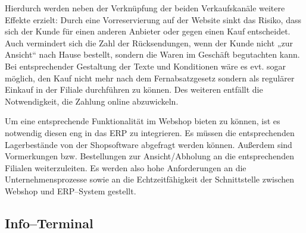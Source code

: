 Hierdurch werden neben der Verknüpfung der beiden Verkaufskanäle weitere Effekte erzielt: Durch eine Vorreservierung auf der Website sinkt das Risiko, dass sich der Kunde für einen anderen Anbieter oder gegen einen Kauf entscheidet. Auch vermindert sich die Zahl der Rücksendungen, wenn der Kunde nicht „zur Ansicht“ nach Hause bestellt, sondern die Waren im Geschäft begutachten kann. Bei entsprechender Gestaltung der Texte und Konditionen wäre es evt. sogar möglich, den Kauf nicht mehr nach dem Fernabsatzgesetz sondern als regulärer Einkauf in der Filiale durchführen zu können. Des weiteren entfällt die Notwendigkeit, die Zahlung online abzuwickeln.

Um eine entsprechende Funktionalität im Webshop bieten zu können, ist es notwendig diesen eng in das \ac{ERP} zu integrieren. Es müssen die entsprechenden Lagerbestände von der Shopsoftware abgefragt werden können. Außerdem sind Vormerkungen bzw. Bestellungen zur Ansicht/Abholung an die entsprechenden Filialen weiterzuleiten.  Es werden also hohe Anforderungen an die Unternehmensprozesse sowie an die Echtzeitfähigkeit der Schnittstelle zwischen Webshop und ERP--System gestellt.

\subsection{Info--Terminal}


